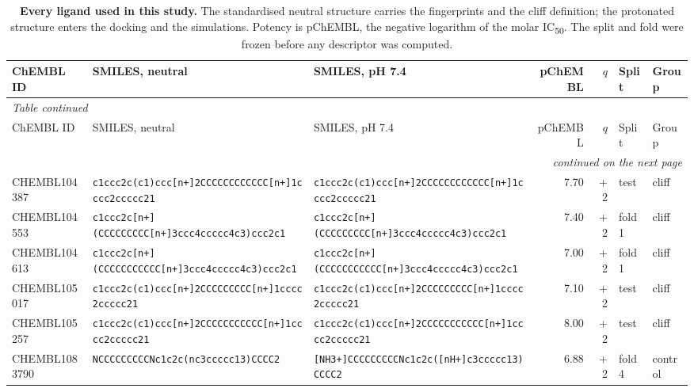 \begin{longtable}{l p{4.4cm} p{4.4cm} r r l l}
\caption{\textbf{Every ligand used in this study.} The standardised neutral
  structure carries the fingerprints and the cliff definition; the protonated
  structure enters the docking and the simulations. Potency is pChEMBL, the
  negative logarithm of the molar IC\textsubscript{50}. The split and fold were frozen
  before any descriptor was computed.}\label{tab:sistructures}\\
\toprule
ChEMBL ID & SMILES, neutral & SMILES, pH 7.4 & pChEMBL & $q$ & Split & Group \\
\midrule
\endfirsthead
\multicolumn{7}{l}{\itshape Table \thetable{} continued}\\
\toprule
ChEMBL ID & SMILES, neutral & SMILES, pH 7.4 & pChEMBL & $q$ & Split & Group \\
\midrule
\endhead
\midrule \multicolumn{7}{r}{\itshape continued on the next page}\\
\endfoot
\bottomrule
\endlastfoot
CHEMBL104387 & \texttt{c1ccc2c(\allowbreak{}c1)\allowbreak{}ccc[n+]\allowbreak{}2CCCCCCCCCCCC[n+]\allowbreak{}1cccc2ccccc21} & \texttt{c1ccc2c(\allowbreak{}c1)\allowbreak{}ccc[n+]\allowbreak{}2CCCCCCCCCCCC[n+]\allowbreak{}1cccc2ccccc21} & 7.70 & +2 & test & cliff \\
CHEMBL104553 & \texttt{c1ccc2c[n+]\allowbreak{}(\allowbreak{}CCCCCCCCC[n+]\allowbreak{}3ccc4ccccc4c3)\allowbreak{}ccc2c1} & \texttt{c1ccc2c[n+]\allowbreak{}(\allowbreak{}CCCCCCCCC[n+]\allowbreak{}3ccc4ccccc4c3)\allowbreak{}ccc2c1} & 7.40 & +2 & fold 1 & cliff \\
CHEMBL104613 & \texttt{c1ccc2c[n+]\allowbreak{}(\allowbreak{}CCCCCCCCCCC[n+]\allowbreak{}3ccc4ccccc4c3)\allowbreak{}ccc2c1} & \texttt{c1ccc2c[n+]\allowbreak{}(\allowbreak{}CCCCCCCCCCC[n+]\allowbreak{}3ccc4ccccc4c3)\allowbreak{}ccc2c1} & 7.00 & +2 & fold 1 & cliff \\
CHEMBL105017 & \texttt{c1ccc2c(\allowbreak{}c1)\allowbreak{}ccc[n+]\allowbreak{}2CCCCCCCCC[n+]\allowbreak{}1cccc2ccccc21} & \texttt{c1ccc2c(\allowbreak{}c1)\allowbreak{}ccc[n+]\allowbreak{}2CCCCCCCCC[n+]\allowbreak{}1cccc2ccccc21} & 7.10 & +2 & test & cliff \\
CHEMBL105257 & \texttt{c1ccc2c(\allowbreak{}c1)\allowbreak{}ccc[n+]\allowbreak{}2CCCCCCCCCCC[n+]\allowbreak{}1cccc2ccccc21} & \texttt{c1ccc2c(\allowbreak{}c1)\allowbreak{}ccc[n+]\allowbreak{}2CCCCCCCCCCC[n+]\allowbreak{}1cccc2ccccc21} & 8.00 & +2 & test & cliff \\
CHEMBL1083790 & \texttt{NCCCCCCCCCNc1c2c(\allowbreak{}nc3ccccc13)\allowbreak{}CCCC2} & \texttt{[NH3+]\allowbreak{}CCCCCCCCCNc1c2c(\allowbreak{}[nH+]\allowbreak{}c3ccccc13)\allowbreak{}CCCC2} & 6.88 & +2 & fold 4 & control \\

\end{longtable}

